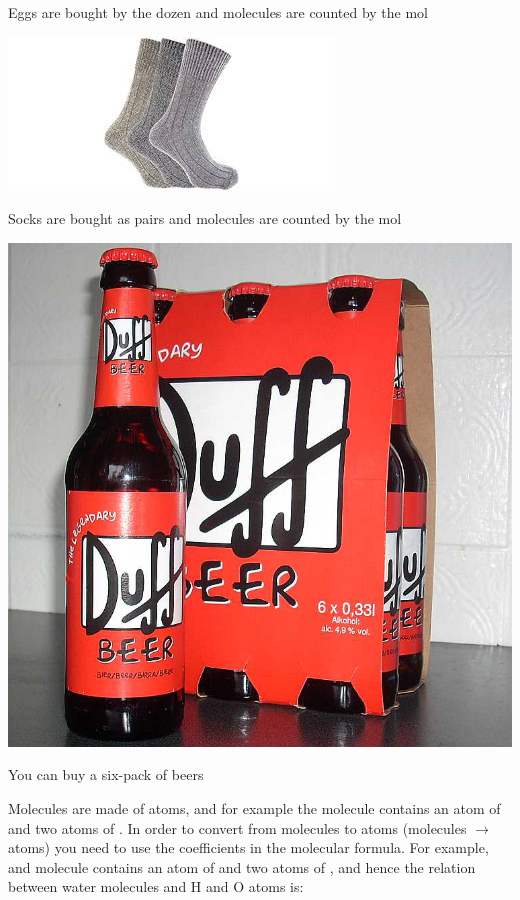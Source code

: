 \documentclass[main.tex]{subfiles}
\begin{document}
\begin{description}
\begin{marginfigure}[-7cm]
      \label{fig:marginfig}
      \caption{Eggs are bought by the dozen and molecules are counted by the mol}
	\end{marginfigure}%
\begin{marginfigure}[2cm]%
      \includegraphics{chapter7/figure4}
      \label{fig:marginfig}
      \caption{Socks are bought as pairs and molecules are counted by the mol}
	\end{marginfigure}%
	\begin{marginfigure}[4cm]%
      \includegraphics{chapter7/figure13}
      \label{fig:marginfig}
      \caption{You can buy a six-pack of beers}
	\end{marginfigure}%
\item[\docfilehook{From molecules to atoms}{From  molecules to atoms}] Molecules are made of atoms, and for example the  molecule contains an atom of  and two atoms of . In order to convert from molecules to atoms (molecules $\rightarrow$ atoms) you need to use the coefficients in the molecular formula. For example, and  molecule contains an atom of  and two atoms of , and hence the relation between water molecules and H and O atoms is:

\end{description}
\end{document}
